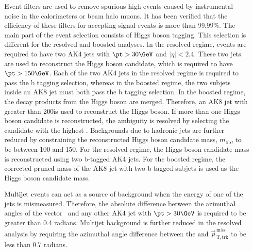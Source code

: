 Event filters are used to remove spurious high \MET events caused by instrumental noise in the calorimeters or beam halo muons. It has been verified that the efficiency of these filters for accepting signal events is more than 99.99\%.
The main part of the event selection consists of Higgs boson tagging. This selection is different for the resolved and boosted analyses.
In the resolved regime, events are 
required to have two AK4 jets with $\pt>30\GeV$ and $|\eta|< 2.4$. 
These two jets are used to reconstruct the Higgs boson candidate, which 
is required to have $\pt > 150\GeV$.
Each of the two AK4 jets in the resolved regime is required to pass the b tagging selection, whereas in the boosted regime, the two subjets inside an AK8 jet must both pass the b tagging selection. 
In the boosted regime, the decay products from the Higgs boson are merged. Therefore, an AK8 jet with \pt greater than 200\GeV is used to reconstruct 
the Higgs boson. If more than one Higgs boson candidate is reconstructed, the ambiguity is resolved by selecting the candidate with the highest \pt. 
Backgrounds due to hadronic jets are further reduced by constraining the reconstructed Higgs boson candidate mass, $m_\mathrm{bb}$, to be between 100 and 150\GeV.
For the resolved regime, the Higgs boson candidate mass is reconstructed using two b-tagged AK4 jets. 
For the boosted regime, the corrected pruned mass of the AK8 jet with two b-tagged subjets is used as the Higgs boson candidate mass. 

Multijet events can act as a source of background  when the energy of one of the jets is mismeasured. 
Therefore, the absolute difference between the azimuthal angles of the vector 
\ptvecmiss\ and any other AK4 jet with $\pt > 30\GeV$ 
is required to be greater than 0.4 radians. 
Multijet background is further reduced in the 
resolved analysis by requiring the azimuthal angle difference between the \ptvecmiss and $\vec{p}_{\mathrm{\, T,trk}}^{\mathrm{\, miss}}$ to be less than 0.7 radians. 

